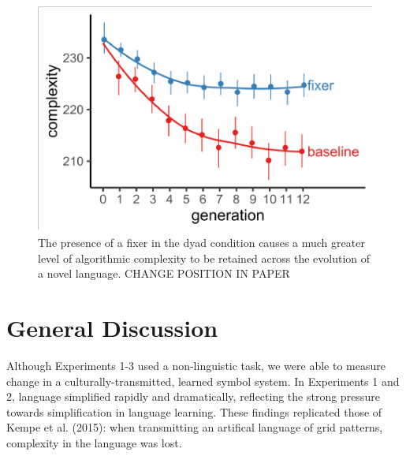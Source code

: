 \documentclass[10pt, letterpaper]{article}
\newenvironment{CodeChunk}{}{}
\begin{document}
\begin{CodeChunk}
\begin{figure}[tb]

{\centering \includegraphics{figs/both_complexity-1} 

}

\caption[The presence of a fixer in the dyad condition causes a much greater level of algorithmic complexity to be retained across the evolution of a novel language]{The presence of a fixer in the dyad condition causes a much greater level of algorithmic complexity to be retained across the evolution of a novel language. CHANGE POSITION IN PAPER}\label{fig:both_complexity}
\end{figure}
\end{CodeChunk}

\hypertarget{general-discussion}{%
\section{General Discussion}\label{general-discussion}}

Although Experiments 1-3 used a non-linguistic task, we were able to
measure change in a culturally-transmitted, learned symbol system. In
Experiments 1 and 2, language simplified rapidly and dramatically,
reflecting the strong pressure towards simplification in language
learning. These findings replicated those of Kempe et al. (2015): when
transmitting an artifical language of grid patterns, complexity in the
language was lost.
\end{document}
